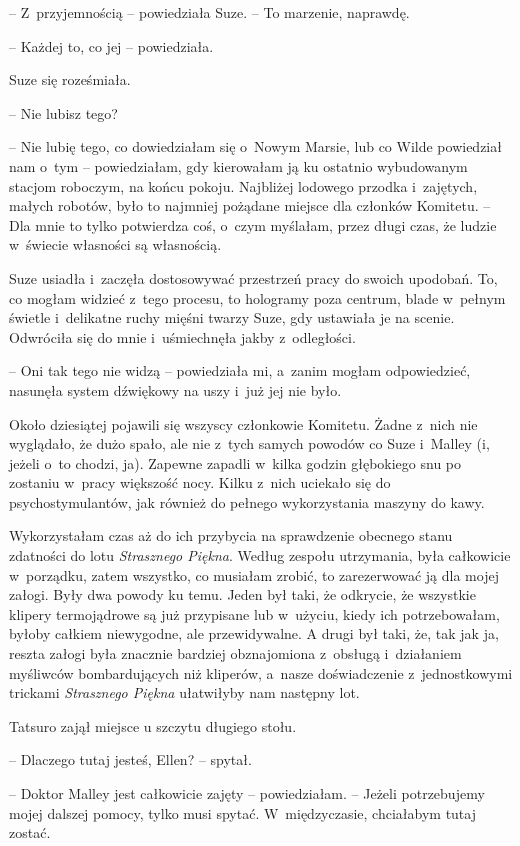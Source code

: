 \documentclass[oneside,polish,11pt,sfheadings]{mwbk}
\begin{document}
-- Z~przyjemnością -- powiedziała Suze. -- To marzenie, naprawdę.

-- Każdej to, co jej -- powiedziała.

Suze się roześmiała. 

-- Nie lubisz tego?

-- Nie lubię tego, co dowiedziałam się o~Nowym Marsie, lub co Wilde
powiedział nam o~tym -- powiedziałam, gdy kierowałam ją ku ostatnio
wybudowanym stacjom roboczym, na końcu pokoju. Najbliżej lodowego
przodka i~zajętych, małych robotów, było to najmniej pożądane miejsce
dla członków Komitetu. -- Dla mnie to tylko potwierdza coś, o~czym
myślałam, przez długi czas, że ludzie w~świecie własności są własnością.

Suze usiadła i~zaczęła dostosowywać przestrzeń pracy do swoich upodobań.
To, co mogłam widzieć z~tego procesu, to hologramy poza centrum, blade w~pełnym świetle i~delikatne ruchy mięśni twarzy Suze, gdy ustawiała je na
scenie. Odwróciła się do mnie i~uśmiechnęła jakby z~odległości.

-- Oni tak tego nie widzą -- powiedziała mi, a~zanim mogłam odpowiedzieć,
nasunęła system dźwiękowy na uszy i~już jej nie było.

Około dziesiątej pojawili się wszyscy członkowie Komitetu. Żadne z~nich
nie wyglądało, że dużo spało, ale nie z~tych samych powodów co Suze i~Malley (i, jeżeli o~to chodzi, ja). Zapewne zapadli w~kilka godzin
głębokiego snu po zostaniu w~pracy większość nocy. Kilku z~nich uciekało
się do psychostymulantów, jak również do pełnego wykorzystania maszyny
do kawy.

Wykorzystałam czas aż do ich przybycia na sprawdzenie obecnego stanu
zdatności do lotu \textit{Strasznego Piękna}. Według zespołu utrzymania,
była całkowicie w~porządku, zatem wszystko, co musiałam zrobić, to
zarezerwować ją dla mojej załogi. Były dwa powody ku temu. Jeden był
taki, że odkrycie, że wszystkie klipery termojądrowe są już przypisane
lub w~użyciu, kiedy ich potrzebowałam, byłoby całkiem niewygodne, ale
przewidywalne. A drugi był taki, że, tak jak ja, reszta załogi była
znacznie bardziej obznajomiona z~obsługą i~działaniem myśliwców
bombardujących niż kliperów, a~nasze doświadczenie z~jednostkowymi
trickami \textit{Strasznego Piękna} ułatwiłyby nam następny lot.

Tatsuro zajął miejsce u szczytu długiego stołu.

-- Dlaczego tutaj jesteś, Ellen? -- spytał.

-- Doktor Malley jest całkowicie zajęty -- powiedziałam. -- Jeżeli
potrzebujemy mojej dalszej pomocy, tylko musi spytać. W~międzyczasie,
chciałabym tutaj zostać.
\end{document}
